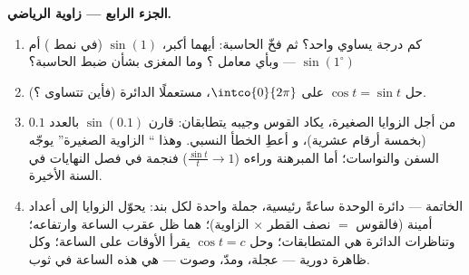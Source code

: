 \begin{problem}
\medskip
\noindent\textbf{الجزء الرابع --- زاوية الرياضي.}
\begin{enumerate}[resume]
  \item كم درجة يساوي  واحد؟ ثم فخّ الحاسبة:
        أيهما أكبر، $\sin(1)$ (في نمط ) أم
        $\sin(1^\circ)$ --- وبأي معامل ؟ وما المغزى
        بشأن ضبط الحاسبة؟
  \item حل $\cos t = \sin t$ على $\intco{0}{2\pi}$، مستعملًا
        الدائرة (فأين تتساوى  ؟).
  \item من أجل الزوايا الصغيرة، يكاد القوس وجيبه يتطابقان:
        قارن $\sin(0.1)$ بالعدد $0.1$ (بخمسة أرقام عشرية)، و
        أعطِ الخطأ النسبي. وهذا `` الزاوية
        الصغيرة'' يوجّه السفن والنواسات؛ أما المبرهنة
        وراءه ($\frac{\sin t}{t} \to 1$) فنجمة في فصل
        النهايات في السنة الأخيرة.
  \item الخاتمة --- دائرة الوحدة ساعةً رئيسية، جملة واحدة
        لكل بند:  يحوّل الزوايا إلى أعداد أمينة (فالقوس
        $=$ نصف القطر $\times$ الزاوية)؛   هما ظل
        عقرب الساعة وارتفاعه؛ وتناظرات الدائرة
        هي المتطابقات؛ وحل $\cos t = c$ يقرأ الأوقات
        على الساعة؛ وكل ظاهرة دورية --- عجلة،
        ومدّ، وصوت --- هي هذه الساعة في ثوب.
\end{enumerate}
\end{problem}
